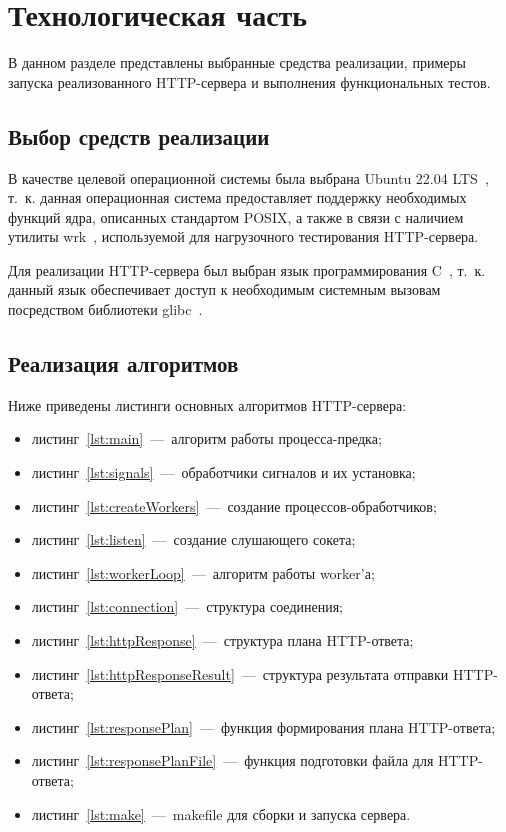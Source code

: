 \chapter{Технологическая часть}

В данном разделе представлены выбранные средства реализации, примеры запуска реализованного HTTP-сервера и выполнения функциональных тестов.

\section{Выбор средств реализации}

В качестве целевой операционной системы была выбрана Ubuntu 22.04 LTS~\cite{ubuntu_2204_help}, т.~к. данная операционная система предоставляет поддержку необходимых функций ядра, описанных стандартом POSIX, а также в связи с наличием утилиты wrk~\cite{ubuntu_wrk}, используемой для нагрузочного тестирования HTTP-сервера.

Для реализации HTTP-сервера был выбран язык программирования C~\cite{iso9899_2011}, т.~к. данный язык обеспечивает доступ к необходимым системным вызовам посредством библиотеки glibc~\cite{glibc_manual}.

\section{Реализация алгоритмов}

Ниже приведены листинги основных алгоритмов HTTP-сервера:
\begin{itemize}
	\item листинг~\ref{lst:main}~---~алгоритм работы процесса-предка;
	\item листинг~\ref{lst:signals}~---~обработчики сигналов и их установка;
	\item листинг~\ref{lst:createWorkers}~---~создание процессов-обработчиков;
	\item листинг~\ref{lst:listen}~---~создание слушающего сокета;
	\item листинг~\ref{lst:workerLoop}~---~алгоритм работы worker'а;
	\item листинг~\ref{lst:connection}~---~структура соединения;
	\item листинг~\ref{lst:httpResponse}~---~структура плана HTTP-ответа;
	\item листинг~\ref{lst:httpResponseResult}~---~структура результата отправки HTTP-ответа;
	\item листинг~\ref{lst:responsePlan}~---~функция формирования плана HTTP-ответа;
	\item листинг~\ref{lst:responsePlanFile}~---~функция подготовки файла для HTTP-ответа;
	\item листинг~\ref{lst:make}~---~makefile для сборки и запуска сервера.
\end{itemize}

